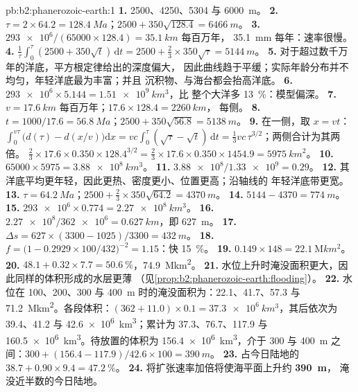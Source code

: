\begin{solution}{pb:b2:phanerozoic-earth:1}
\textbf{1.} 2500、4250、5304 与 \qty{6000}{m}。
\textbf{2.} $\tau = 2 \times 64.2 = \qty{128.4}{Ma}$；$2500 + 350\sqrt{128.4} = \qty{6466}{m}$。
\textbf{3.} $\num{293e6}/(65000 \times 128.4) = \qty{35.1}{km}$ 每百万年，
\qty{35.1}{mm} 每年：速率很慢。
\textbf{4.} $\frac1\tau\int_0^\tau(2500 + 350\sqrt t)\,\mathrm{d}t = 2500 + \frac23 \times
350\sqrt\tau = \qty{5144}{m}$。
\textbf{5.} 对于超过数千万年的洋底，平方根定律给出的深度偏大，
因此曲线趋于平缓；实际年龄分布并不均匀，年轻洋底最为丰富；并且
沉积物、与海台都会抬高洋底。
\textbf{6.} $\num{293e6} \times 5.144 = \qty{1.51e9}{km^3}$，比
整个大洋多 \qty{13}{\percent}：模型偏深。
\textbf{7.} $v = \qty{17.6}{km}$ 每百万年；$17.6 \times 128.4 = \qty{2260}{km}$，
每侧。
\textbf{8.} $t = 1000/17.6 = \qty{56.8}{Ma}$；$2500 + 350\sqrt{56.8} = \qty{5138}{m}$。
\textbf{9.} 在一侧，取 $x = vt$：$\int_0^{v\tau}\bigl(d(\tau) - d(x/v)\bigr)\mathrm{d}x
= vc\int_0^\tau(\sqrt\tau - \sqrt t)\,\mathrm{d}t = \frac13 vc\,\tau^{3/2}$；两侧合计为其两倍。
$\frac23 \times 17.6 \times 0.350 \times 128.4^{3/2} = \frac23 \times 17.6 \times 0.350 \times
1454.9 = \qty{5975}{km^2}$。
\textbf{10.} $65000 \times 5975 = \qty{3.88e8}{km^3}$。
\textbf{11.} $\num{3.88e8}/\num{1.33e9} = 0.29$。
\textbf{12.} 其洋底平均更年轻，因此更热、密度更小、位置更高；沿轴线的
年轻洋底带更宽。
\textbf{13.} $\tau = \qty{64.2}{Ma}$；$2500 + \frac23 \times 350\sqrt{64.2} = \qty{4370}{m}$。
\textbf{14.} $5144 - 4370 = \qty{774}{m}$。
\textbf{15.} $\num{293e6} \times 0.774 = \qty{2.27e8}{km^3}$。
\textbf{16.} $\num{2.27e8}/\num{362e6} = \qty{0.627}{km}$，即 \qty{627}{m}。
\textbf{17.} $\Delta s = 627 \times (3300 - 1025)/3300 = \qty{432}{m}$。
\textbf{18.} $f = \bigl(1 - 0.2929 \times 100/432\bigr)^{-2} = 1.15$：快 \qty{15}{\percent}。
\textbf{19.} $0.149 \times 148 = \qty{22.1}{\mega km^2}$。
\textbf{20.} $48.1 + 0.32 \times 7.7 = \qty{50.6}{\percent}$，\qty{74.9}{\mega km^2}。
\textbf{21.} 水位上升时淹没面积更大，因此同样的体积形成的水层更薄
（见\cref{prop:b2:phanerozoic-earth:flooding}）。
\textbf{22.} 水位在 100、200、300 与 \qty{400}{m} 时的淹没面积为：22.1、41.7、57.3 与
\qty{71.2}{\mega km^2}。各段体积：$(362 + 11.0) \times 0.1 = \qty{37.3e6}{km^3}$，其后依次为 39.4、41.2
与 \qty{42.6e6}{km^3}；累计为 37.3、76.7、117.9 与 \qty{160.5e6}{km^3}。待放置的体积为
\qty{156.4e6}{km^3}，介于 300 与 \qty{400}{m} 之间：$300 + (156.4 - 117.9)/42.6 \times 100
= \qty{390}{m}$。
\textbf{23.} 占今日陆地的 $38.7 + 0.90 \times 9.4 = \qty{47.2}{\percent}$。
\textbf{24.} 将扩张速率加倍将使海平面上升约 \textbf{\qty{390}{m}}，
淹没近半数的今日陆地。
\end{solution}
